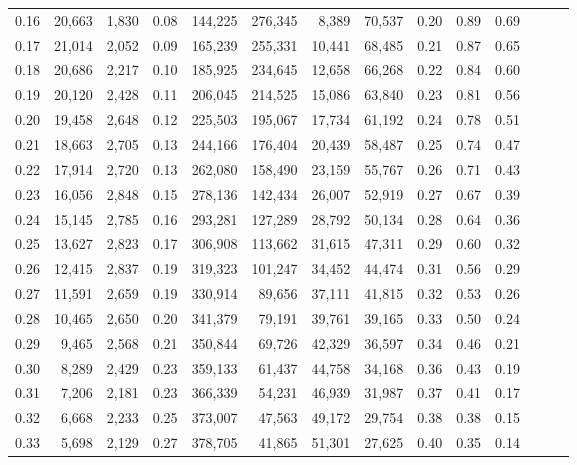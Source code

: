 \begin{tabular}{rrrrrrrrrrrrrr}
0.16 &  20,663 &  1,830 &  0.08 &  144,225 &  276,345 &   8,389 &  70,537 &  0.20 &  0.89 &      0.69 \\
0.17 &  21,014 &  2,052 &  0.09 &  165,239 &  255,331 &  10,441 &  68,485 &  0.21 &  0.87 &      0.65 \\
0.18 &  20,686 &  2,217 &  0.10 &  185,925 &  234,645 &  12,658 &  66,268 &  0.22 &  0.84 &      0.60 \\
0.19 &  20,120 &  2,428 &  0.11 &  206,045 &  214,525 &  15,086 &  63,840 &  0.23 &  0.81 &      0.56 \\
0.20 &  19,458 &  2,648 &  0.12 &  225,503 &  195,067 &  17,734 &  61,192 &  0.24 &  0.78 &      0.51 \\
0.21 &  18,663 &  2,705 &  0.13 &  244,166 &  176,404 &  20,439 &  58,487 &  0.25 &  0.74 &      0.47 \\
0.22 &  17,914 &  2,720 &  0.13 &  262,080 &  158,490 &  23,159 &  55,767 &  0.26 &  0.71 &      0.43 \\
0.23 &  16,056 &  2,848 &  0.15 &  278,136 &  142,434 &  26,007 &  52,919 &  0.27 &  0.67 &      0.39 \\
0.24 &  15,145 &  2,785 &  0.16 &  293,281 &  127,289 &  28,792 &  50,134 &  0.28 &  0.64 &      0.36 \\
0.25 &  13,627 &  2,823 &  0.17 &  306,908 &  113,662 &  31,615 &  47,311 &  0.29 &  0.60 &      0.32 \\
0.26 &  12,415 &  2,837 &  0.19 &  319,323 &  101,247 &  34,452 &  44,474 &  0.31 &  0.56 &      0.29 \\
0.27 &  11,591 &  2,659 &  0.19 &  330,914 &   89,656 &  37,111 &  41,815 &  0.32 &  0.53 &      0.26 \\
0.28 &  10,465 &  2,650 &  0.20 &  341,379 &   79,191 &  39,761 &  39,165 &  0.33 &  0.50 &      0.24 \\
0.29 &   9,465 &  2,568 &  0.21 &  350,844 &   69,726 &  42,329 &  36,597 &  0.34 &  0.46 &      0.21 \\
0.30 &   8,289 &  2,429 &  0.23 &  359,133 &   61,437 &  44,758 &  34,168 &  0.36 &  0.43 &      0.19 \\
0.31 &   7,206 &  2,181 &  0.23 &  366,339 &   54,231 &  46,939 &  31,987 &  0.37 &  0.41 &      0.17 \\
0.32 &   6,668 &  2,233 &  0.25 &  373,007 &   47,563 &  49,172 &  29,754 &  0.38 &  0.38 &      0.15 \\
0.33 &   5,698 &  2,129 &  0.27 &  378,705 &   41,865 &  51,301 &  27,625 &  0.40 &  0.35 &      0.14 \\

\end{tabular}
